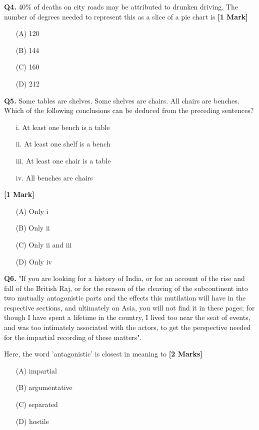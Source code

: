 \documentclass[11pt]{article}
\newcommand{\questiona}[2]{
    \noindent\textbf{Q#2.} #1 \hfill \textbf{[1 Mark]}
}
\newcommand{\questionb}[2]{
    \noindent\textbf{Q#2.} #1 \hfill \textbf{[2 Marks]}
}
\begin{document}
\vspace{0.5cm}

\questiona{40\% of deaths on city roads may be attributed to drunken driving. The number of degrees needed to represent this as a slice of a pie chart is}{4}
\begin{enumerate}
    \item[(A)] 120
    \item[(B)] 144  
    \item[(C)] 160
    \item[(D)] 212
\end{enumerate}

\vspace{0.5cm}

\questiona{Some tables are shelves. Some shelves are chairs. All chairs are benches. Which of the following conclusions can be deduced from the preceding sentences?
\begin{enumerate}
    \item[i.] At least one bench is a table
    \item[ii.] At least one shelf is a bench
    \item[iii.] At least one chair is a table
    \item[iv.] All benches are chairs
\end{enumerate}}{5}
\begin{enumerate}
    \item[(A)] Only i
    \item[(B)] Only ii  
    \item[(C)] Only ii and iii
    \item[(D)] Only iv
\end{enumerate}

\hspace{0.5cm}

\questionb{"If you are looking for a history of India, or for an account of the rise and fall of the British Raj, or for the reason of the cleaving of the subcontinent into two mutually antagonistic parts and the effects this mutilation will have in the respective sections, and ultimately on Asia, you will not find it in these pages; for though I have spent a lifetime in the country, I lived too near the seat of events, and was too intimately associated with the actors, to get the perspective needed for the impartial recording of these matters".

Here, the word 'antagonistic' is closest in meaning to}{6}
\begin{enumerate}
    \item[(A)] impartial
    \item[(B)] argumentative  
    \item[(C)] separated
    \item[(D)] hostile
\end{enumerate}
\end{document}
